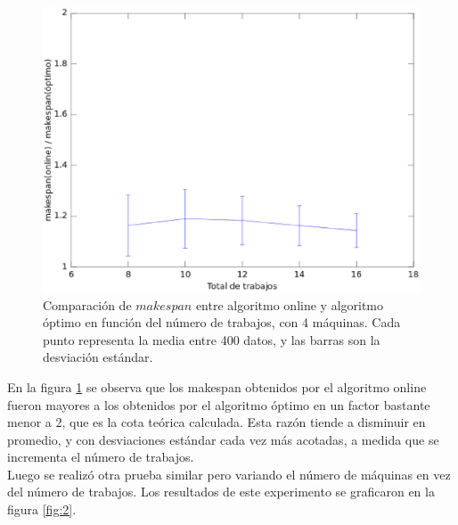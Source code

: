 \documentclass[12pt,letterpaper]{article}
\begin{document}
\begin{figure}[ht]
\centering
\includegraphics[scale=0.75]{fig1.eps}
\caption{Comparación de $makespan$ entre algoritmo online y algoritmo óptimo en función del número de trabajos, con 4 máquinas. Cada punto representa la media entre 400 datos, y las barras son la desviación estándar.}
\label{fig:1}
\end{figure}

En la figura \ref{fig:1} se observa que los makespan obtenidos por el algoritmo online fueron mayores a los obtenidos por el algoritmo óptimo en un factor bastante menor a 2, que es la cota teórica calculada. Esta razón tiende a disminuir en promedio, y con desviaciones estándar cada vez más acotadas, a medida que se incrementa el número de trabajos.\\

Luego se realizó otra prueba similar pero variando el número de máquinas en vez del número de trabajos. Los resultados de este experimento se graficaron en la figura \ref{fig:2}.
\end{document}
